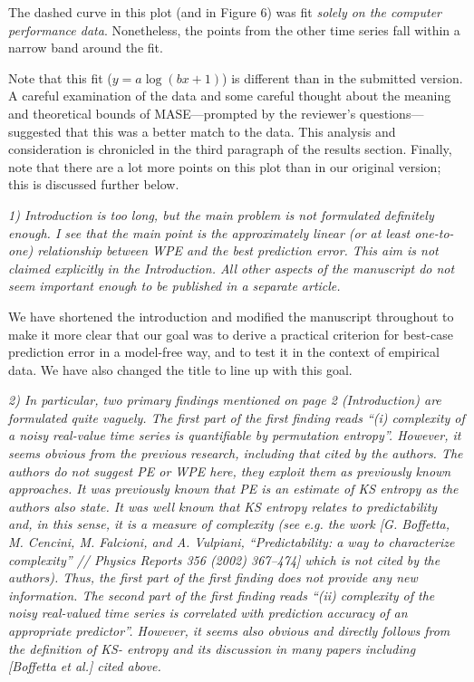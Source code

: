 \documentclass[12pt]{article}
\begin{document}
\noindent The dashed curve in this plot (and in Figure 6) was fit
\emph{solely on the computer performance data}.  Nonetheless, the
points from the other time series fall within a narrow band around the
fit.

Note that this fit ($y = a \log(b x + 1)$) is different than in the
submitted version.  A careful examination of the data and some careful
thought about the meaning and theoretical bounds of MASE---prompted by
the reviewer's questions---suggested that this was a better match to
the data.  This analysis and consideration is chronicled in the third
paragraph of the results section.  Finally, note that there are a lot
more points on this plot than in our original version; this is
discussed further below.

\smallskip

\emph{1) Introduction is too long, but the main problem is not
  formulated definitely enough. I see that the main point is the
  approximately linear (or at least one-to-one) relationship between
  WPE and the best prediction error. This aim is not claimed
  explicitly in the Introduction. All other aspects of the manuscript
  do not seem important enough to be published in a separate article.}

We have shortened the introduction and modified the manuscript
throughout to make it more clear that our goal was to derive a
practical criterion for best-case prediction error in a model-free
way, and to test it in the context of empirical data.  We have also
changed the title to line up with this goal.

\smallskip

\emph{2) In particular, two primary findings mentioned on page 2
  (Introduction) are formulated quite vaguely. The first part of the
  first finding reads ``(i) complexity of a noisy real-value time
  series is quantifiable by permutation entropy''. However, it seems
  obvious from the previous research, including that cited by the
  authors. The authors do not suggest PE or WPE here, they exploit
  them as previously known approaches. It was previously known that PE
  is an estimate of KS entropy as the authors also state. It was well
  known that KS entropy relates to predictability and, in this sense,
  it is a measure of complexity (see e.g. the work [G. Boffetta,
    M. Cencini, M. Falcioni, and A.  Vulpiani, ``Predictability: a way
    to characterize complexity'' // Physics Reports 356 (2002)
    367–474] which is not cited by the authors). Thus, the first part
  of the first finding does not provide any new information. The
  second part of the first finding reads ``(ii) complexity of the
  noisy real-valued time series is correlated with prediction accuracy
  of an appropriate predictor''.  However, it seems also obvious and
  directly follows from the definition of KS- entropy and its
  discussion in many papers including [Boffetta et al.] cited above.}
\end{document}

